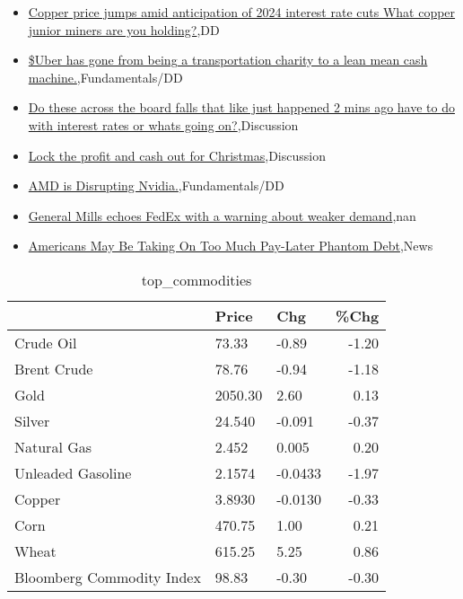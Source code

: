 \documentclass{article}%
\begin{document}
%
\begin{itemize}%
\item%
\href{https://reddit.com/r/Baystreetbets/comments/18n4u3f/copper\_price\_jumps\_amid\_anticipation\_of\_2024/}{Copper price jumps amid anticipation of 2024 interest rate cuts  What copper junior miners are you holding?},DD%
\item%
\href{https://reddit.com/r/StockMarket/comments/18nk9yx/uber\_has\_gone\_from\_being\_a\_transportation\_charity/}{\$Uber has gone from being a transportation charity to a lean mean cash machine.},Fundamentals/DD%
\item%
\href{https://reddit.com/r/StockMarket/comments/18n4ohj/do\_these\_across\_the\_board\_falls\_that\_like\_just/}{Do these across the board falls that like just happened 2 mins ago have to do with interest rates or whats going on?},Discussion%
\item%
\href{https://reddit.com/r/StockMarket/comments/18n39ld/lock\_the\_profit\_and\_cash\_out\_for\_christmas/}{Lock the profit and cash out for Christmas},Discussion%
\item%
\href{https://reddit.com/r/StockMarket/comments/18myhwr/amd\_is\_disrupting\_nvidia/}{AMD is Disrupting Nvidia.},Fundamentals/DD%
\item%
\href{https://reddit.com/r/Economics/comments/18n8z5w/general\_mills\_echoes\_fedex\_with\_a\_warning\_about/}{General Mills echoes FedEx with a warning about weaker demand},nan%
\item%
\href{https://reddit.com/r/Economics/comments/18n63w9/americans\_may\_be\_taking\_on\_too\_much\_paylater/}{Americans May Be Taking On Too Much Pay-Later Phantom Debt},News%
\end{itemize}%


\begin{table}[htbp]%
\caption{top\_commodities}%
\centering%
\begin{adjustbox}{width=1\textwidth}%
\begin{tabular}{lllr}
\toprule
                          &   Price &     Chg &  \%Chg \\
\midrule
               Crude Oil  &   73.33 &   -0.89 & -1.20 \\
             Brent Crude  &   78.76 &   -0.94 & -1.18 \\
                    Gold  & 2050.30 &    2.60 &  0.13 \\
                  Silver  &  24.540 &  -0.091 & -0.37 \\
             Natural Gas  &   2.452 &   0.005 &  0.20 \\
       Unleaded Gasoline  &  2.1574 & -0.0433 & -1.97 \\
                  Copper  &  3.8930 & -0.0130 & -0.33 \\
                    Corn  &  470.75 &    1.00 &  0.21 \\
                   Wheat  &  615.25 &    5.25 &  0.86 \\
Bloomberg Commodity Index &   98.83 &   -0.30 & -0.30 \\
\bottomrule
\end{tabular}
%
\end{adjustbox}%
\end{table}
\end{document}
